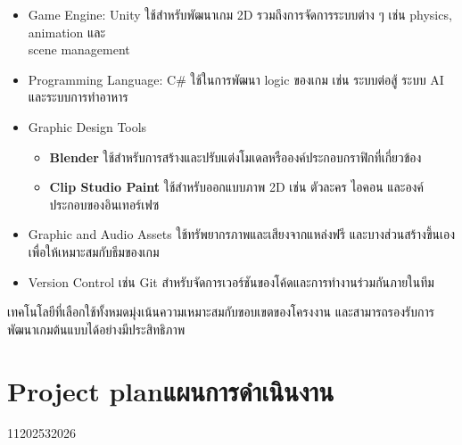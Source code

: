    \begin{itemize}
        \item Game Engine: Unity\newline
        \hspace{1.5em}ใช้สำหรับพัฒนาเกม 2D รวมถึงการจัดการระบบต่าง ๆ เช่น physics, animation และ \\scene management
        \item Programming Language: C\#\newline
        \hspace{1.5em}ใช้ในการพัฒนา logic ของเกม เช่น ระบบต่อสู้ ระบบ AI และระบบการทำอาหาร
        \item Graphic Design Tools
            \begin{itemize}
                \item \textbf{Blender} ใช้สำหรับการสร้างและปรับแต่งโมเดลหรือองค์ประกอบกราฟิกที่เกี่ยวข้อง
                \item \textbf{Clip Studio Paint} ใช้สำหรับออกแบบภาพ 2D เช่น ตัวละคร ไอคอน และองค์ประกอบของอินเทอร์เฟซ
            \end{itemize}
        \item Graphic and Audio Assets\newline
        \hspace{1.5em}ใช้ทรัพยากรภาพและเสียงจากแหล่งฟรี และบางส่วนสร้างขึ้นเองเพื่อให้เหมาะสมกับธีมของเกม
        \item Version Control\newline
        \hspace{1.5em}เช่น Git สำหรับจัดการเวอร์ชันของโค้ดและการทำงานร่วมกันภายในทีม
    \end{itemize}

    เทคโนโลยีที่เลือกใช้ทั้งหมดมุ่งเน้นความเหมาะสมกับขอบเขตของโครงงาน และสามารถรองรับการ\\พัฒนาเกมต้นแบบได้อย่างมีประสิทธิภาพ

\section{\ifenglish Project plan\else แผนการดำเนินงาน\fi}

\begin{plan}{11}{2025}{3}{2026}
\end{plan}
\newpage
